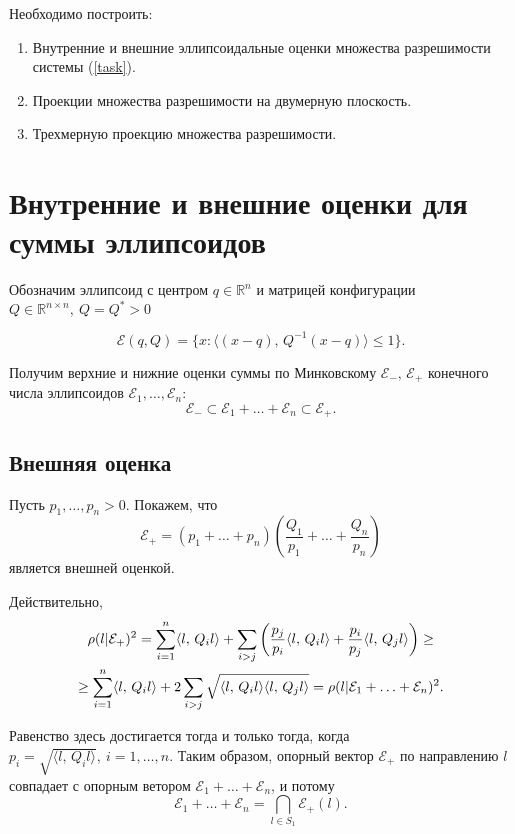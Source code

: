 \documentclass[16pt]{article}
\newcommand\Real{\mathbb{R}}
\newcommand\Sum[2]{\sum\limits_{#1}^{#2}}
\newcommand\Scal[2]{\langle #1,\, #2 \rangle}
\begin{document}
Необходимо построить:
\begin{enumerate}
	\item Внутренние и внешние эллипсоидальные оценки множества разрешимости системы (\ref{task}).
	\item Проекции множества разрешимости на двумерную плоскость.
	\item Трехмерную проекцию множества разрешимости.
	
\end{enumerate}

\section{Внутренние и внешние оценки для суммы эллипсоидов}

Обозначим эллипсоид с центром $q \in \Real^n$ и матрицей конфигурации $Q \in \Real^{n \times n},\ Q = Q^* > 0$ 

$$\mathcal{E}(q, Q) = \{x\colon \Scal{(x - q)}{Q^{-1}(x - q)} \leq 1\}.$$

Получим верхние и нижние оценки суммы по Минковскому $\mathcal{E}_-,\, \mathcal{E}_+$ конечного числа эллипсоидов $\mathcal{E}_1, \ldots, \mathcal{E}_n$:
$$\mathcal{E}_- \subset \mathcal{E}_1 + \ldots + \mathcal{E}_n \subset \mathcal{E}_+.$$

\subsection{Внешняя оценка}
Пусть $p_1, \ldots, p_n > 0$. Покажем, что 
$$\mathcal{E}_+ = (p_1 + \ldots + p_n)\left(\dfrac{Q_1}{p_1} + \ldots + \dfrac{Q_n}{p_n}\right)$$
является внешней оценкой.

Действительно,
\begin{multline}\notag
\rho(l|\mathcal{E}_+)^2 = \Sum{i=1}{n}\Scal{l}{Q_il} + \sum_{i > j} \left(\dfrac{p_j}{p_i}\Scal{l}{Q_il} + \dfrac{p_i}{p_j}\Scal{l}{Q_jl}\right) \geq \\ \geq\Sum{i=1}{n}\Scal{l}{Q_il} + 2\sum_{i > j}\sqrt{\Scal{l}{Q_il}\Scal{l}{Q_jl}} = \rho(l|\mathcal{E}_1 + \ldots + \mathcal{E}_n)^2.
\end{multline}

Равенство здесь достигается тогда и только тогда, когда $p_i = \sqrt{\Scal{l}{Q_il}},\ i = 1, \ldots, n$. Таким образом, опорный вектор $\mathcal{E}_+$ по направлению $l$ совпадает с опорным ветором $\mathcal{E}_1 + \ldots + \mathcal{E}_n$, и потому
$$ \mathcal{E}_1 + \ldots + \mathcal{E}_n = \bigcap_{l \in S_1} \mathcal{E}_+(l).$$
\end{document}
